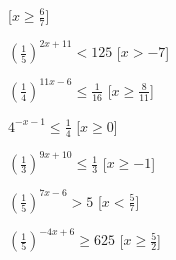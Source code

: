 \begin{esercizio}
\begin{multicols}{2}
\begin{enumeratea}
   \hfill [\(x \geqslant \frac{6}{7}\)]
  \item  \(\left(\frac{1}{5}\right)^{2 x +11} < 125\)
   \hfill [\(x > -7\)]
  \item  \(\left(\frac{1}{4}\right)^{11 x -6} \leqslant \frac{1}{16}\)
   \hfill [\(x \geqslant \frac{8}{11}\)]
  \item  \(4^{- x -1} \leqslant \frac{1}{4}\)
   \hfill [\(x \geqslant 0\)]
  \item  \(\left(\frac{1}{3}\right)^{9 x +10} \leqslant \frac{1}{3}\)
   \hfill [\(x \geqslant -1\)]
  \item  \(\left(\frac{1}{5}\right)^{7 x -6} > 5\)
   \hfill [\(x < \frac{5}{7}\)]
  \item  \(\left(\frac{1}{5}\right)^{-4 x +6} \geqslant 625\)
   \hfill [\(x \geqslant \frac{5}{2}\)]
 \end{enumeratea}
 \end{multicols}
\end{esercizio}


